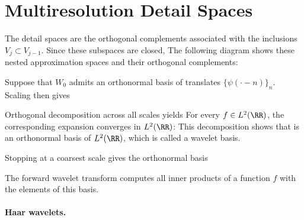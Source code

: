 \section{Multiresolution Detail Spaces}

The detail spaces are the orthogonal complements associated with the inclusions $V_j \subset V_{j-1}$. Since these subspaces are closed,
The following diagram shows these nested approximation spaces and their orthogonal complements:
\begin{center}
\end{center}
Suppose that $W_0$ admits an orthonormal basis of translates $\{\psi(\cdot-n)\}_n$. Scaling then gives

Orthogonal decomposition across all scales yields
For every $f \in L^2(\RR)$, the corresponding expansion converges in $L^2(\RR)$:
This decomposition shows that 
is an orthonormal basis of $L^2(\RR)$, which is called a wavelet basis.
 
Stopping at a coarsest scale gives the orthonormal basis

The forward wavelet transform computes all inner products of a function $f$ with the elements of this basis.




  
\paragraph{Haar wavelets.}

